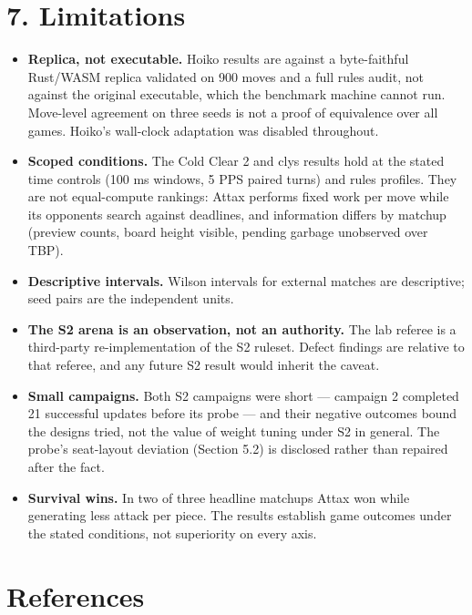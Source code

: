 \documentclass[
  11pt,
]{article}
\providecommand{\tightlist}{%
  \setlength{\itemsep}{0pt}\setlength{\parskip}{0pt}}
\begin{document}
\section{7. Limitations}\label{limitations}

\begin{itemize}
\tightlist
\item
  \textbf{Replica, not executable.} Hoiko results are against a
  byte-faithful Rust/WASM replica validated on 900 moves and a full
  rules audit, not against the original executable, which the benchmark
  machine cannot run. Move-level agreement on three seeds is not a proof
  of equivalence over all games. Hoiko's wall-clock adaptation was
  disabled throughout.
\item
  \textbf{Scoped conditions.} The Cold Clear 2 and clys results hold at
  the stated time controls (100 ms windows, 5 PPS paired turns) and
  rules profiles. They are not equal-compute rankings: Attax performs
  fixed work per move while its opponents search against deadlines, and
  information differs by matchup (preview counts, board height visible,
  pending garbage unobserved over TBP).
\item
  \textbf{Descriptive intervals.} Wilson intervals for external matches
  are descriptive; seed pairs are the independent units.
\item
  \textbf{The S2 arena is an observation, not an authority.} The lab
  referee is a third-party re-implementation of the S2 ruleset. Defect
  findings are relative to that referee, and any future S2 result would
  inherit the caveat.
\item
  \textbf{Small campaigns.} Both S2 campaigns were short --- campaign 2
  completed 21 successful updates before its probe --- and their
  negative outcomes bound the designs tried, not the value of weight
  tuning under S2 in general. The probe's seat-layout deviation (Section
  5.2) is disclosed rather than repaired after the fact.
\item
  \textbf{Survival wins.} In two of three headline matchups Attax won
  while generating less attack per piece. The results establish game
  outcomes under the stated conditions, not superiority on every axis.
\end{itemize}

\section{References}\label{references}
\end{document}
